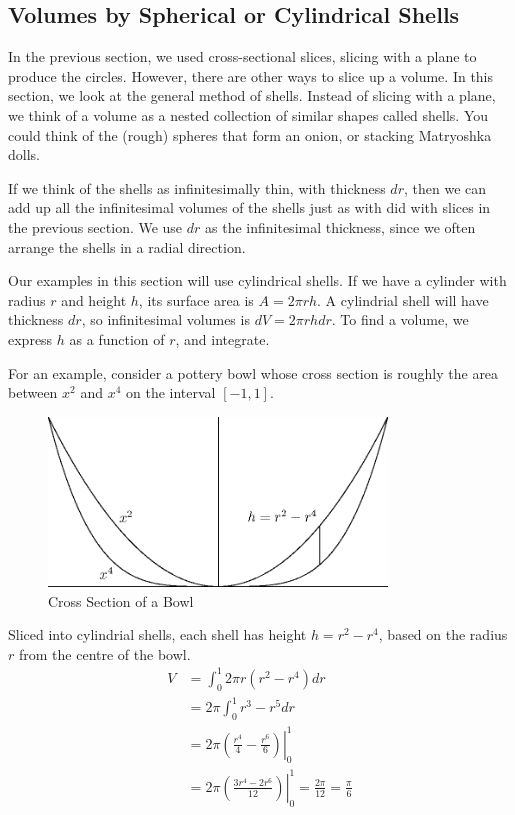 \documentclass[fleqn]{report}
\begin{document}
\subsection{Volumes by Spherical or Cylindrical Shells}
\label{shells}

In the previous section, we used cross-sectional slices,
slicing with a plane to produce the circles. However, there
are other ways to slice up a volume. In this section, we look
at the general method of shells. Instead of slicing with a
plane, we think of a volume as a nested collection of similar
shapes called shells. You could think of the (rough) spheres
that form an onion, or stacking Matryoshka dolls. 

If we think of the shells as infinitesimally thin, with
thickness $dr$, then we can add up all the infinitesimal
volumes of the shells just as with did with slices in the
previous section. We use $dr$ as the infinitesimal thickness,
since we often arrange the shells in a radial direction.

Our examples in this section will use cylindrical shells. If
we have a cylinder with radius $r$ and height $h$, its surface
area is $A = 2\pi r h$. A cylindrial shell will have
thickness $dr$, so infinitesimal volumes is $dV = 2\pi r h dr$.
To find a volume, we express $h$ as a function of $r$, and
integrate.

\begin{example}
For an example, consider a pottery bowl whose cross section is
roughly the area between $x^2$ and $x^4$ on the interval
$[-1,1]$. 

\begin{figure}[ht]
\centering
\includegraphics[width=9cm]{figure21.eps}
\caption{Cross Section of a Bowl}
\label{figure-cross-section-bowl}
\end{figure}

Sliced into cylindrial shells, each shell has height $h = r^2
- r^4$, based on the radius $r$ from the centre of the bowl.
\begin{align*}
V & = \int_0^1 2\pi r (r^2 - r^4) dr \\
& = 2\pi \int_0^1 r^3 - r^5 dr \\
& = \left. 2\pi \left( \frac{r^4}{4} - \frac{r^6}{6} \right)
\right|_0^1\\
& = \left. 2\pi \left( \frac{3r^4 - 2r^6}{12} \right) \right|_0^1 =
\frac{2\pi}{12} = \frac{\pi}{6} 
\end{align*}
\end{example}
\end{document}
